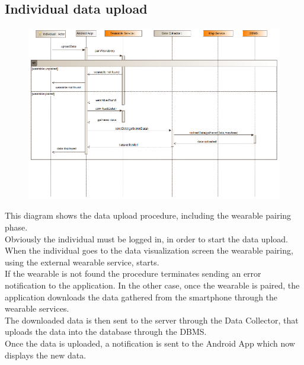 \subsection{Individual data upload}
\begin{figure}[H]
\centering
\includegraphics[width=\linewidth]{resources/uml/sequence/wearablePairing.png}
\end{figure}
This diagram shows the data upload procedure, including the wearable pairing phase.\\
Obviously the individual must be logged in, in order to start the data upload.\\
When the individual goes to the data visualization screen the wearable pairing, using the external wearable service, starts.\\
If the wearable is not found the procedure terminates sending an error notification to the application.
In the other case, once the wearable is paired, the application downloads the data gathered from the smartphone through the wearable services.\\
The downloaded data is then sent to the server through the Data Collector, that uploads the data into the database through the DBMS.\\
Once the data is uploaded, a notification is sent to the Android App which now displays the new data.

